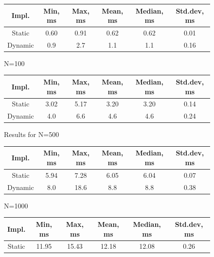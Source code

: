 \documentclass[a4paper,11pt]{article}
\begin{document}
\begin{appendices}
        \begin{figure}[H]
            \centering
            \begin{tabular}{c|c|c|c|c|c}
                Impl. & Min, ms & Max, ms & Mean, ms & Median, ms & Std.dev, ms \\
                \hline
                \hline
                Static & 0.60 & 0.91 & 0.62 & 0.62 & 0.01 \\
                \hline
                Dynamic & 0.9 & 2.7 & 1.1 & 1.1 & 0.16 \\
            \end{tabular}
            \caption{N=100}
        \end{figure}
        \begin{figure}[H]
            \centering
            \begin{tabular}{c|c|c|c|c|c}
                Impl. & Min, ms & Max, ms & Mean, ms & Median, ms & Std.dev, ms \\
                \hline
                \hline
                Static & 3.02 & 5.17 & 3.20 & 3.20 & 0.14 \\
                \hline
                Dynamic & 4.0 & 6.6 & 4.6 & 4.6 & 0.24 \\
            \end{tabular}
            \caption{Results for N=500}
        \end{figure}
        \begin{figure}[H]
            \centering
            \begin{tabular}{c|c|c|c|c|c}
                Impl. & Min, ms & Max, ms & Mean, ms & Median, ms & Std.dev, ms \\
                \hline
                \hline
                Static & 5.94 & 7.28 & 6.05 & 6.04 & 0.07 \\
                \hline
                Dynamic & 8.0 & 18.6 & 8.8 & 8.8 & 0.38 \\
            \end{tabular}
            \caption{N=1000}
        \end{figure}
        \begin{figure}[H]
            \centering
            \begin{tabular}{c|c|c|c|c|c}
                Impl. & Min, ms & Max, ms & Mean, ms & Median, ms & Std.dev, ms \\
                \hline
                \hline
                Static & 11.95 & 15.43 & 12.18 & 12.08 & 0.26 \\

\end{tabular}
\end{figure}
\end{appendices}
\end{document}
